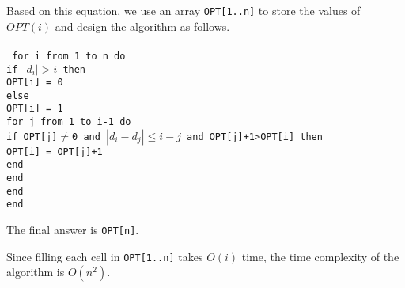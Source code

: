 \documentclass[12pt,letterpaper]{article}
\begin{document}
Based on this equation, we use an array \texttt{OPT[1..n]} to store the values of $OPT(i)$ and design the algorithm as follows.
\\
\\\tt
for i from 1 to n do\\
\mbox{\hspace{2em}}if $|d_i| > i$ then\\
\mbox{\hspace{4em}}OPT[i] = 0\\
\mbox{\hspace{2em}}else\\
\mbox{\hspace{4em}}OPT[i] = 1\\
\mbox{\hspace{4em}}for j from 1 to i-1 do\\
\mbox{\hspace{5em}}if OPT[j]$\ne$0 and $|d_i-d_j|\le i-j$ and OPT[j]+1>OPT[i] then\\
\mbox{\hspace{7em}}OPT[i] = OPT[j]+1\\
\mbox{\hspace{5em}}end\\
\mbox{\hspace{4em}}end\\
\mbox{\hspace{2em}}end\\
end\\
\rm

The final answer is \texttt{OPT[n]}.

Since filling each cell in \texttt{OPT[1..n]} takes $O(i)$ time, the time complexity of the algorithm is $O(n^2)$.
\end{document}
